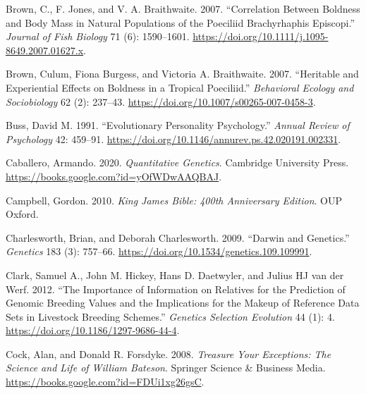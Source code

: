 \documentclass[
]{book}
\newlength{\cslhangindent}
\newlength{\cslentryspacingunit} %
\newenvironment{CSLReferences}[2] %
 {%
  \setlength{\parindent}{0pt}
  \ifodd #1
  \let\oldpar\par
  \def\par{\hangindent=\cslhangindent\oldpar}
  \fi
  \setlength{\parskip}{#2\cslentryspacingunit}
 }%
 {}
\begin{document}
\begin{CSLReferences}{1}{0}
\leavevmode{}%
Brown, C., F. Jones, and V. A. Braithwaite. 2007. {``Correlation Between Boldness and Body Mass in Natural Populations of the Poeciliid {Brachyrhaphis} Episcopi.''} \emph{Journal of Fish Biology} 71 (6): 1590--1601. \url{https://doi.org/10.1111/j.1095-8649.2007.01627.x}.

\leavevmode{}%
Brown, Culum, Fiona Burgess, and Victoria A. Braithwaite. 2007. {``Heritable and Experiential Effects on Boldness in a Tropical Poeciliid.''} \emph{Behavioral Ecology and Sociobiology} 62 (2): 237--43. \url{https://doi.org/10.1007/s00265-007-0458-3}.

\leavevmode{}%
Buss, David M. 1991. {``Evolutionary Personality Psychology.''} \emph{Annual Review of Psychology} 42: 459--91. \url{https://doi.org/10.1146/annurev.ps.42.020191.002331}.

\leavevmode{}%
Caballero, Armando. 2020. \emph{Quantitative {Genetics}}. {Cambridge University Press}. \url{https://books.google.com?id=yOfWDwAAQBAJ}.

\leavevmode{}%
Campbell, Gordon. 2010. \emph{King {James Bible}: 400th {Anniversary Edition}}. {OUP Oxford}.

\leavevmode{}%
Charlesworth, Brian, and Deborah Charlesworth. 2009. {``Darwin and {Genetics}.''} \emph{Genetics} 183 (3): 757--66. \url{https://doi.org/10.1534/genetics.109.109991}.

\leavevmode{}%
Clark, Samuel A., John M. Hickey, Hans D. Daetwyler, and Julius HJ van der Werf. 2012. {``The Importance of Information on Relatives for the Prediction of Genomic Breeding Values and the Implications for the Makeup of Reference Data Sets in Livestock Breeding Schemes.''} \emph{Genetics Selection Evolution} 44 (1): 4. \url{https://doi.org/10.1186/1297-9686-44-4}.

\leavevmode{}%
Cock, Alan, and Donald R. Forsdyke. 2008. \emph{Treasure {Your Exceptions}: {The Science} and {Life} of {William Bateson}}. {Springer Science \& Business Media}. \url{https://books.google.com?id=FDUi1xg26gsC}.


\end{CSLReferences}
\end{document}
